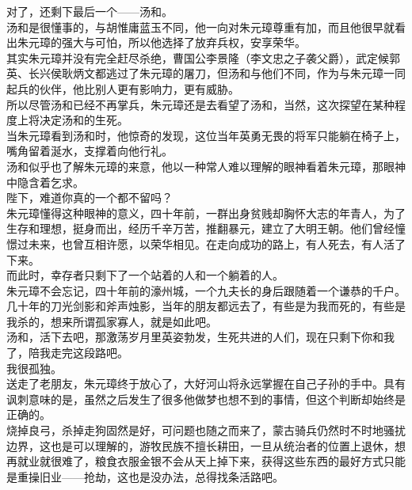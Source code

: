 \begin{multicols}{\theparacolNo}
对了，还剩下最后一个——汤和。\\

汤和是很懂事的，与胡惟庸蓝玉不同，他一向对朱元璋尊重有加，而且他很早就看出朱元璋的强大与可怕，所以他选择了放弃兵权，安享荣华。\\

其实朱元璋并没有完全赶尽杀绝，曹国公李景隆（李文忠之子袭父爵），武定候郭英、长兴侯耿炳文都逃过了朱元璋的屠刀，但汤和与他们不同，作为与朱元璋一同起兵的伙伴，他比别人更有影响力，更有威胁。\\

所以尽管汤和已经不再掌兵，朱元璋还是去看望了汤和，当然，这次探望在某种程度上将决定汤和的生死。\\

当朱元璋看到汤和时，他惊奇的发现，这位当年英勇无畏的将军只能躺在椅子上，嘴角留着涎水，支撑着向他行礼。\\

汤和似乎也了解朱元璋的来意，他以一种常人难以理解的眼神看着朱元璋，那眼神中隐含着乞求。\\

陛下，难道你真的一个都不留吗？\\

朱元璋懂得这种眼神的意义，四十年前，一群出身贫贱却胸怀大志的年青人，为了生存和理想，挺身而出，经历千辛万苦，推翻暴元，建立了大明王朝。他们曾经憧憬过未来，也曾互相许愿，以荣华相见。在走向成功的路上，有人死去，有人活了下来。\\

而此时，幸存者只剩下了一个站着的人和一个躺着的人。\\

朱元璋不会忘记，四十年前的濠州城，一个九夫长的身后跟随着一个谦恭的千户。\\

几十年的刀光剑影和斧声烛影，当年的朋友都远去了，有些是为我而死的，有些是我杀的，想来所谓孤家寡人，就是如此吧。\\

汤和，活下去吧，那激荡岁月里英姿勃发，生死共进的人们，现在只剩下你和我了，陪我走完这段路吧。\\

我很孤独。\\

送走了老朋友，朱元璋终于放心了，大好河山将永远掌握在自己子孙的手中。具有讽刺意味的是，虽然之后发生了很多他做梦也想不到的事情，但这个判断却始终是正确的。\\

烧掉良弓，杀掉走狗固然是好，可问题也随之而来了，蒙古骑兵仍然时不时地骚扰边界，这也是可以理解的，游牧民族不擅长耕田，一旦从统治者的位置上退休，想再就业就很难了，粮食衣服金银不会从天上掉下来，获得这些东西的最好方式只能是重操旧业——抢劫，这也是没办法，总得找条活路吧。\\


\end{multicols}

